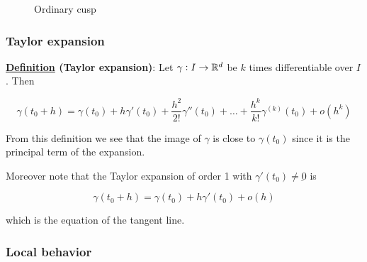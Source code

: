 \documentclass[10pt]{extarticle}
\renewcommand{\vec}[1]{\underbar{\ensuremath{#1}}}
\begin{document}
\begin{figure}[H]
    \centering
    \caption{Ordinary cusp}
    \label{fig:ordinary_cusp}
\end{figure}

\subsubsection{Taylor expansion}

\textbf{\underline{Definition} (Taylor expansion)}:
Let $\gamma: I \to \mathbb{R}^d$ be $k$ times differentiable over $I$.
Then

$$
    \gamma(t_0 + h) =
    \gamma(t_0) +
    h \gamma'(t_0) +
    \frac{h^2}{2!} \gamma''(t_0) +
    \ldots +
    \frac{h^k}{k!} \gamma^{(k)}(t_0) +
    o(h^k)
$$

From this definition we see that the image of $\gamma$ is close to $\gamma (t_0)$ since it is the principal term of the expansion.

Moreover note that the Taylor expansion of order 1 with $\gamma'(t_0) \ne \vec{0}$ is

$$
    \gamma(t_0 + h) = \gamma(t_0) + h \gamma'(t_0) + o(h)
$$

which is the equation of the tangent line.

\subsubsection{Local behavior}
\end{document}
